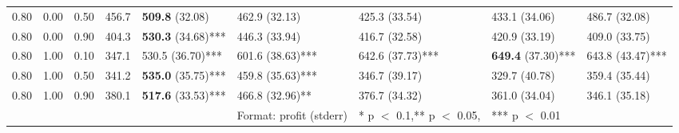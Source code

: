 \documentclass{article}
\begin{document}
\begin{landscape}
\begin{table}[b]
{\begin{tabular}{rrrllllll}
  0.80 & 0.00 & 0.50 & 456.7            & \textbf{509.8} (32.08)    & 462.9 (32.13)    & 425.3 (33.54)    & 433.1 (34.06)    & 486.7 (32.08)    \\ 
  0.80 & 0.00 & 0.90 & 404.3            & \textbf{530.3} (34.68)*** & 446.3 (33.94)    & 416.7 (32.58)    & 420.9 (33.19)    & 409.0 (33.75)    \\ 
  0.80 & 1.00 & 0.10 & 347.1            & 530.5 (36.70)*** & 601.6 (38.63)*** & 642.6 (37.73)*** & \textbf{649.4} (37.30)*** & 643.8 (43.47)*** \\ 
  0.80 & 1.00 & 0.50 & 341.2            & \textbf{535.0} (35.75)*** & 459.8 (35.63)*** & 346.7 (39.17)    & 329.7 (40.78)    & 359.4 (35.44)    \\ 
  0.80 & 1.00 & 0.90 & 380.1            & \textbf{517.6} (33.53)*** & 466.8 (32.96)**  & 376.7 (34.32)    & 361.0 (34.04)    & 346.1 (35.18)    \\ 
   \hline
& & & & & Format: profit (stderr) & * p $<$ 0.1,** p $<$ 0.05, & *** p $<$ 0.01 
\end{tabular}
}
\end{table}












\end{landscape}
\end{document}
